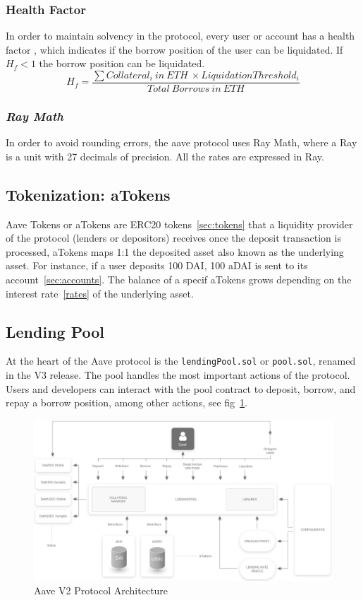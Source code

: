 \documentclass[11pt,a4paper]{report}
\begin{document}
\subsubsection{Health Factor}\label{hf}
In order to maintain solvency in the protocol, every user or account has a health factor\cite{aaveV1}\cite{risk} , which indicates if the borrow position of the user can be liquidated. If~$H_{f} < 1$ the borrow position can be liquidated.
\[ H_{f} = \frac{\sum Collateral_{i}~in~ETH~\times Liquidation Threshold_{i}}{Total~Borrows~in~ETH} \]

\subsubsection{\textit{Ray Math}}\label{ray}
In order to avoid rounding errors, the aave protocol uses Ray Math\cite{ray}\cite{ray2}, where a Ray is a unit with 27 decimals of precision. All the rates are expressed in Ray.
\subsection{Tokenization: aTokens}\label{atokens}
Aave Tokens or aTokens\cite{aaveV1aToken} are ERC20 tokens~\ref{sec:tokens} that a liquidity provider of the protocol (lenders or depositors) receives once the deposit transaction is processed, aTokens maps 1:1 the deposited asset also known as the underlying asset. For instance, if a user deposits 100 DAI, 100 aDAI is sent to its account~\ref{sec:accounts}. The balance of a specif aTokens grows depending on the interest rate~\ref{rates} of the underlying asset. 
\subsection{Lending Pool}
At the heart of the Aave protocol is the \verb|lendingPool.sol| or \verb|pool.sol|, renamed in the V3\cite{aaveV3} release. The pool handles the most important actions of the protocol. Users and developers can interact with the pool contract to deposit, borrow, and repay a borrow position, among other actions, see fig~\ref{fig:pool_arch}. 
\begin{figure}[htp]
	\centering
	\includegraphics[width=1\textwidth]{./images/pool_arch}
	\caption{Aave V2 Protocol Architecture\cite{aaveV2}}
	\label{fig:pool_arch}
\end{figure}
\end{document}
